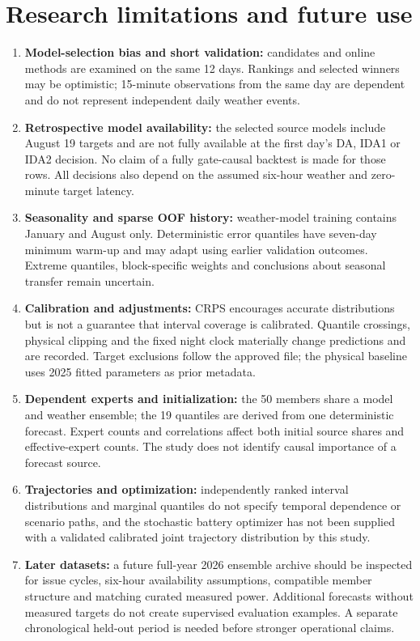 \documentclass[11pt,a4paper]{article}
\begin{document}
\section{Research limitations and future use}
\begin{enumerate}
\item \textbf{Model-selection bias and short validation:} candidates and online methods are examined on the same 12 days. Rankings and selected winners may be optimistic; 15-minute observations from the same day are dependent and do not represent independent daily weather events.
\item \textbf{Retrospective model availability:} the selected source models include August 19 targets and are not fully available at the first day's DA, IDA1 or IDA2 decision. No claim of a fully gate-causal backtest is made for those rows. All decisions also depend on the assumed six-hour weather and zero-minute target latency.
\item \textbf{Seasonality and sparse OOF history:} weather-model training contains January and August only. Deterministic error quantiles have seven-day minimum warm-up and may adapt using earlier validation outcomes. Extreme quantiles, block-specific weights and conclusions about seasonal transfer remain uncertain.
\item \textbf{Calibration and adjustments:} CRPS encourages accurate distributions but is not a guarantee that interval coverage is calibrated. Quantile crossings, physical clipping and the fixed night clock materially change predictions and are recorded. Target exclusions follow the approved file; the physical baseline uses 2025 fitted parameters as prior metadata.
\item \textbf{Dependent experts and initialization:} the 50 members share a model and weather ensemble; the 19 quantiles are derived from one deterministic forecast. Expert counts and correlations affect both initial source shares and effective-expert counts. The study does not identify causal importance of a forecast source.
\item \textbf{Trajectories and optimization:} independently ranked interval distributions and marginal quantiles do not specify temporal dependence or scenario paths, and the stochastic battery optimizer has not been supplied with a validated calibrated joint trajectory distribution by this study.
\item \textbf{Later datasets:} a future full-year 2026 ensemble archive should be inspected for issue cycles, six-hour availability assumptions, compatible member structure and matching curated measured power. Additional forecasts without measured targets do not create supervised evaluation examples. A separate chronological held-out period is needed before stronger operational claims.
\end{enumerate}
\end{document}
